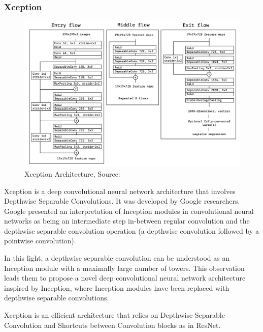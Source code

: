         \subsubsection{Xception} 
        \begin{figure}
            \centering
            \includegraphics[width=1\linewidth]{graphics//chapter3/xception arch.png}
            \caption{Xception Architecture, Source: \cite{xception}}
            \label{fig:xception-arch}
        \end{figure}
        
        Xception is a deep convolutional neural network architecture that involves Depthwise Separable Convolutions. It was developed by Google researchers. Google presented an interpretation of Inception modules in convolutional neural networks as being an intermediate step in-between regular convolution and the depthwise separable convolution operation (a depthwise convolution followed by a pointwise convolution)\cite{xception}. \par \vspace{1em}
        
        In this light, a depthwise separable convolution can be understood as an Inception module with a maximally large number of towers. This observation leads them to propose a novel deep convolutional neural network architecture inspired by Inception, where Inception modules have been replaced with depthwise separable convolutions.\par \vspace{1em}

        Xception is an efficient architecture that relies on Depthwise Separable Convolution and Shortcuts between Convolution blocks as in ResNet.
        

